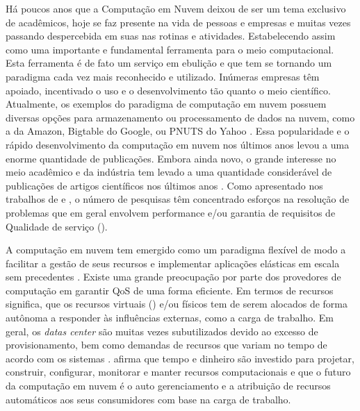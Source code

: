 Há poucos anos que a Computação em Nuvem deixou de ser um tema exclusivo de acadêmicos, hoje se faz presente na vida de pessoas e empresas e muitas vezes passando despercebida em suas nas rotinas e atividades. Estabelecendo assim como uma importante e fundamental ferramenta para o meio computacional. Esta ferramenta é de fato um serviço em ebulição e que tem se tornando um paradigma cada vez mais reconhecido e utilizado. Inúmeras empresas têm apoiado, incentivado o uso e o desenvolvimento tão quanto o meio científico. Atualmente, os exemplos do paradigma de computação em nuvem possuem diversas opções para armazenamento ou processamento de dados na nuvem, como a \textit{} da Amazon, Bigtable do Google, ou PNUTS do Yahoo \cite{Binnig2009}. Essa popularidade e o rápido desenvolvimento da computação em nuvem nos últimos anos levou a uma enorme quantidade de publicações. Embora ainda novo, o grande interesse no meio acadêmico e da indústria tem levado a uma quantidade considerável de publicações de artigos científicos nos últimos anos \cite{Heilig2014}.
Como apresentado nos trabalhos de  e , o número de pesquisas têm concentrado esforços na resolução de problemas que em geral envolvem performance e/ou garantia de requisitos de Qualidade de serviço (\textit{}). 

A computação em nuvem tem emergido como um paradigma flexível de modo a facilitar a gestão de seus recursos e implementar aplicações elásticas em escala sem precedentes \cite{Cervino2012}. Existe uma grande preocupação por parte dos provedores de computação em garantir QoS de uma forma eficiente. Em termos de recursos significa, que os recursos virtuais (\textit{}) e/ou físicos tem de serem alocados de forma autônoma a responder às influências externas, como a carga de trabalho. Em geral, os \textit{datas center} são muitas vezes subutilizados devido ao excesso de provisionamento, bem como demandas de recursos que variam no tempo de acordo com os sistemas \cite{Padala2007}.  afirma que tempo e dinheiro são investido para projetar, construir, configurar, monitorar e manter recursos computacionais e que o futuro da computação em nuvem é o auto gerenciamento e a atribuição de recursos automáticos aos seus consumidores com base na carga de trabalho.

